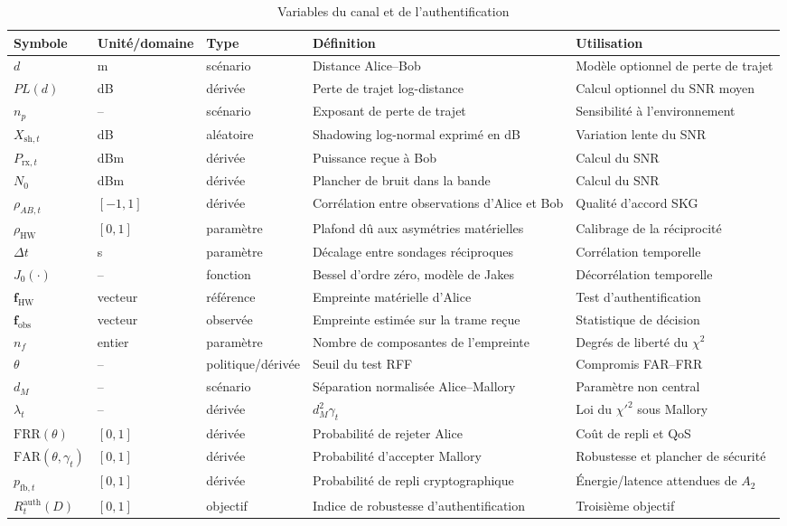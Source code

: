 \documentclass[conference,a4paper]{IEEEtran}
\newcommand{\Rauth}{R^{\mathrm{auth}}}
\newcommand{\FAR}{\mathrm{FAR}}
\newcommand{\FRR}{\mathrm{FRR}}
\begin{document}
\begin{table}[H]
\caption{Variables du canal et de l'authentification}
\label{tab:variables-auth}
\centering\footnotesize
\begin{tabularx}{\textwidth}{@{}l l l Y Y@{}}
\toprule
Symbole & Unité/domaine & Type & Définition & Utilisation \\
\midrule
$d$ & m & scénario & Distance Alice--Bob & Modèle optionnel de perte de trajet \\
$PL(d)$ & dB & dérivée & Perte de trajet log-distance & Calcul optionnel du SNR moyen \\
$n_p$ & -- & scénario & Exposant de perte de trajet & Sensibilité à l'environnement \\
$X_{\mathrm{sh},t}$ & dB & aléatoire & Shadowing log-normal exprimé en dB & Variation lente du SNR \\
$P_{\mathrm{rx},t}$ & dBm & dérivée & Puissance reçue à Bob & Calcul du SNR \\
$N_0$ & dBm & dérivée & Plancher de bruit dans la bande & Calcul du SNR \\
$\rho_{AB,t}$ & $[-1,1]$ & dérivée & Corrélation entre observations d'Alice et Bob & Qualité d'accord SKG \\
$\rho_{\mathrm{HW}}$ & $[0,1]$ & paramètre & Plafond dû aux asymétries matérielles & Calibrage de la réciprocité \\
$\Delta t$ & s & paramètre & Décalage entre sondages réciproques & Corrélation temporelle \\
$J_0(\cdot)$ & -- & fonction & Bessel d'ordre zéro, modèle de Jakes & Décorrélation temporelle \cite{jakes1974} \\
$\mathbf{f}_{\mathrm{HW}}$ & vecteur & référence & Empreinte matérielle d'Alice & Test d'authentification \\
$\mathbf{f}_{\mathrm{obs}}$ & vecteur & observée & Empreinte estimée sur la trame reçue & Statistique de décision \\
$n_f$ & entier & paramètre & Nombre de composantes de l'empreinte & Degrés de liberté du $\chi^2$ \\
$\theta$ & -- & politique/dérivée & Seuil du test RFF & Compromis FAR--FRR \\
$d_M$ & -- & scénario & Séparation normalisée Alice--Mallory & Paramètre non central \\
$\lambda_t$ & -- & dérivée & $d_M^2\gamma_t$ & Loi du $\chi'^2$ sous Mallory \\
$\FRR(\theta)$ & $[0,1]$ & dérivée & Probabilité de rejeter Alice & Coût de repli et QoS \\
$\FAR(\theta,\gamma_t)$ & $[0,1]$ & dérivée & Probabilité d'accepter Mallory & Robustesse et plancher de sécurité \\
$p_{\mathrm{fb},t}$ & $[0,1]$ & dérivée & Probabilité de repli cryptographique & Énergie/latence attendues de $A_2$ \\
$\Rauth_t(D)$ & $[0,1]$ & objectif & Indice de robustesse d'authentification & Troisième objectif \\
\bottomrule
\end{tabularx}
\end{table}
\end{document}
